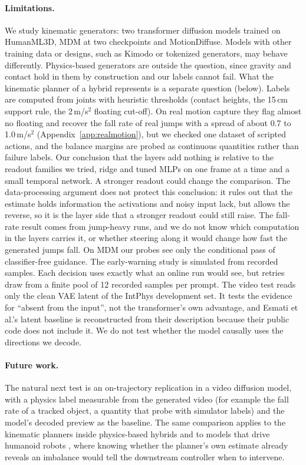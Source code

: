 \paragraph{Limitations.} We study kinematic generators: two transformer diffusion models trained on HumanML3D, MDM at two checkpoints and MotionDiffuse. Models with other training data or designs, such as Kimodo \citep{rempe2026kimodo} or tokenized generators, may behave differently. Physics-based generators are outside the question, since gravity and contact hold in them by construction and our labels cannot fail. What the kinematic planner of a hybrid represents is a separate question (below). Labels are computed from joints with heuristic thresholds (contact heights, the 15\,cm support rule, the 2\,m/s$^2$ floating cut-off). On real motion capture they flag almost no floating and recover the fall rate of real jumps with a spread of about 0.7 to 1.0\,m/s$^2$ (Appendix~\ref{app:realmotion}), but we checked one dataset of scripted actions, and the balance margins are probed as continuous quantities rather than failure labels. Our conclusion that the layers add nothing is relative to the readout families we tried, ridge and tuned MLPs on one frame at a time and a small temporal network. A stronger readout could change the comparison. The data-processing argument does not protect this conclusion: it rules out that the estimate holds information the activations and noisy input lack, but allows the reverse, so it is the layer side that a stronger readout could still raise. The fall-rate result comes from jump-heavy runs, and we do not know which computation in the layers carries it, or whether steering along it would change how fast the generated jumps fall. On MDM our probes see only the conditional pass of classifier-free guidance. The early-warning study is simulated from recorded samples. Each decision uses exactly what an online run would see, but retries draw from a finite pool of 12 recorded samples per prompt. The video test reads only the clean VAE latent of the IntPhys development set. It tests the evidence for ``absent from the input'', not the transformer's own advantage, and Esmati et al.'s latent baseline is reconstructed from their description because their public code does not include it. We do not test whether the model causally uses the directions we decode.

\paragraph{Future work.} The natural next test is an on-trajectory replication in a video diffusion model, with a physics label measurable from the generated video (for example the fall rate of a tracked object, a quantity that \citet{kneifl2026physics} probe with simulator labels) and the model's decoded preview as the baseline. The same comparison applies to the kinematic planners inside physics-based hybrids \citep{tevet2024closd} and to models that drive humanoid robots \citep{wang2026motionbricks}, where knowing whether the planner's own estimate already reveals an imbalance would tell the downstream controller when to intervene.
